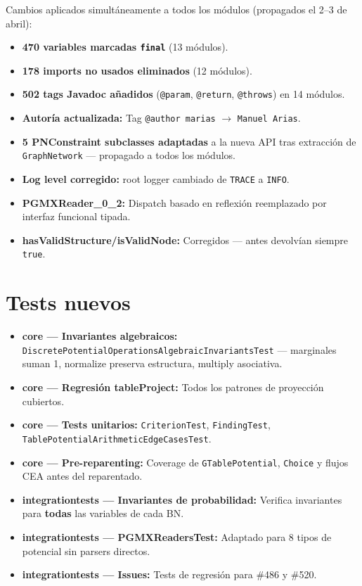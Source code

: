 \documentclass[11pt,a4paper]{article}
\begin{document}
Cambios aplicados simultáneamente a todos los módulos (propagados el 2--3 de abril):

\begin{itemize}
  \item \textbf{470 variables marcadas \texttt{final}} (13 módulos).
  \item \textbf{178 imports no usados eliminados} (12 módulos).
  \item \textbf{502 tags Javadoc añadidos} (\texttt{@param}, \texttt{@return}, \texttt{@throws}) en 14 módulos.
  \item \textbf{Autoría actualizada:} Tag \texttt{@author marias} $\rightarrow$ \texttt{Manuel Arias}.
  \item \textbf{5 PNConstraint subclasses adaptadas} a la nueva API tras extracción de \texttt{GraphNetwork} --- propagado a todos los módulos.
  \item \textbf{Log level corregido:} root logger cambiado de \texttt{TRACE} a \texttt{INFO}.
  \item \textbf{PGMXReader\_0\_2:} Dispatch basado en reflexión reemplazado por interfaz funcional tipada.
  \item \textbf{hasValidStructure/isValidNode:} Corregidos --- antes devolvían siempre \texttt{true}.
\end{itemize}

\section{Tests nuevos}

\begin{itemize}
  \item \textbf{core --- Invariantes algebraicos:} \texttt{DiscretePotentialOperationsAlgebraicInvariantsTest} --- marginales suman 1, normalize preserva estructura, multiply asociativa.
  \item \textbf{core --- Regresión tableProject:} Todos los patrones de proyección cubiertos.
  \item \textbf{core --- Tests unitarios:} \texttt{CriterionTest}, \texttt{FindingTest}, \texttt{TablePotentialArithmeticEdgeCasesTest}.
  \item \textbf{core --- Pre-reparenting:} Coverage de \texttt{GTablePotential}, \texttt{Choice} y flujos CEA antes del reparentado.
  \item \textbf{integrationtests --- Invariantes de probabilidad:} Verifica invariantes para \textbf{todas} las variables de cada BN.
  \item \textbf{integrationtests --- PGMXReadersTest:} Adaptado para 8 tipos de potencial sin parsers directos.
  \item \textbf{integrationtests --- Issues:} Tests de regresión para \#486 y \#520.
\end{itemize}
\end{document}
